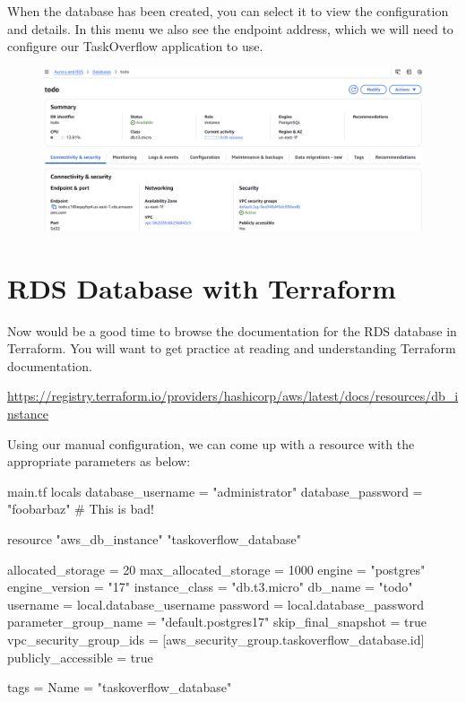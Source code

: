 \documentclass{csse4400}
\begin{document}
\noindent
When the database has been created, you can select it to view the configuration and details.
In this menu we also see the endpoint address, which we will need to configure our TaskOverflow application to use.

\begin{figure}[H]
  \includegraphics[width=\textwidth]{images/aws_5}
\end{figure}


\section{RDS Database with Terraform}

Now would be a good time to browse the documentation for the RDS database in Terraform.
You will want to get practice at reading and understanding Terraform documentation.

\noindent \url{https://registry.terraform.io/providers/hashicorp/aws/latest/docs/resources/db_instance}

Using our manual configuration, we can come up with a resource with the appropriate parameters as below:

\begin{code}[language=terraform,numbers=none]{main.tf}
locals {
  database_username = "administrator"
  database_password = "foobarbaz"  # This is bad!
}

resource "aws_db_instance" "taskoverflow_database" {
  allocated_storage      = 20
  max_allocated_storage  = 1000
  engine                 = "postgres"
  engine_version         = "17"
  instance_class         = "db.t3.micro"
  db_name                = "todo"
  username               = local.database_username
  password               = local.database_password
  parameter_group_name   = "default.postgres17"
  skip_final_snapshot    = true
  vpc_security_group_ids = [aws_security_group.taskoverflow_database.id]
  publicly_accessible    = true

  tags = {
    Name = "taskoverflow_database"
  }
}
\end{code}
\end{document}
